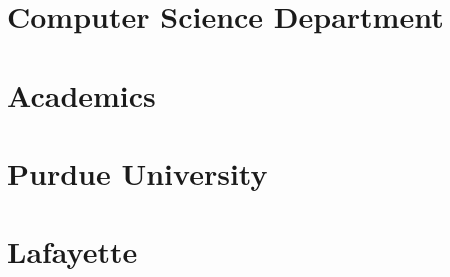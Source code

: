 \documentclass[letterpaper,10pt]{article}
\begin{document}
\pagebreak
\section{Computer Science Department}




\pagebreak
\section{Academics}







\pagebreak
\section{Purdue University}





\pagebreak
\section{Lafayette}



\end{document}
